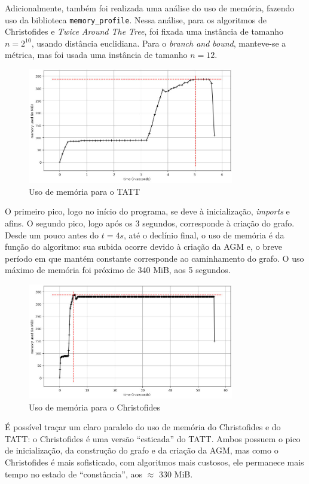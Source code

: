 \documentclass{article}
\begin{document}
Adicionalmente, também foi realizada uma análise do uso de memória, fazendo uso da biblioteca \texttt{memory\_profile}. Nessa análise, para os algoritmos de Christofides e \textit{Twice Around The Tree}, foi fixada uma instância de tamanho \( n = 2^{10} \), usando distância euclidiana. Para o \textit{branch and bound}, manteve-se a métrica, mas foi usada uma instância de tamanho \( n = 12 \).

\begin{figure} [H]
	\includegraphics[width=9cm]{mem-tatt}
	\centering
	\captionsetup{labelformat=empty}
	\caption{Uso de memória para o TATT}
\end{figure}

O primeiro pico, logo no início do programa, se deve à inicialização, \textit{imports} e afins. O segundo pico, logo após os 3 segundos, corresponde à criação do grafo. Desde um pouco antes do \( t = 4s \), até o declínio final, o uso de memória é da função do algoritmo: sua subida ocorre devido à criação da AGM e, o breve período em que mantém constante corresponde ao caminhamento do grafo. O uso máximo de memória foi próximo de 340 MiB, aos 5 segundos.

\begin{figure} [H]
	\includegraphics[width=9cm]{mem-chris}
	\centering
	\captionsetup{labelformat=empty}
	\caption{Uso de memória para o Christofides}
\end{figure}

É possível traçar um claro paralelo do uso de memória do Christofides e do TATT: o Christofides é uma versão ``esticada'' do TATT. Ambos possuem o pico de inicialização, da construção do grafo e da criação da AGM, mas como o Christofides é mais sofisticado, com algoritmos mais custosos, ele permanece mais tempo no estado de ``constância'', aos \( \approx \) 330 MiB.
\end{document}
